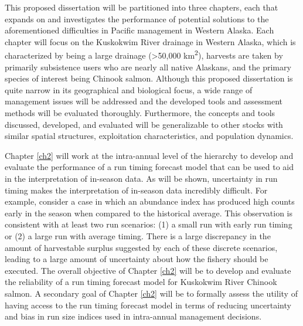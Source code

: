\documentclass[12pt,]{book}
\theoremstyle{definition}
\theoremstyle{definition}
\theoremstyle{definition}
\theoremstyle{remark}
\begin{document}
This proposed dissertation will be partitioned into three chapters, each
that expands on and investigates the performance of potential solutions
to the aforementioned difficulties in Pacific management in Western
Alaska. Each chapter will focus on the Kuskokwim River drainage in
Western Alaska, which is characterized by being a large drainage
(\textgreater{}50,000 km\textsuperscript{2}), harvests are taken by
primarily subsistence users who are nearly all native Alaskans, and the
primary species of interest being Chinook salmon. Although this proposed
dissertation is quite narrow in its geographical and biological focus, a
wide range of management issues will be addressed and the developed
tools and assessment methods will be evaluated thoroughly. Furthermore,
the concepts and tools discussed, developed, and evaluated will be
generalizable to other stocks with similar spatial structures,
exploitation characteristics, and population dynamics.

Chapter \ref{ch2} will work at the intra-annual level of the hierarchy
to develop and evaluate the performance of a run timing forecast model
that can be used to aid in the interpretation of in-season data. As will
be shown, uncertainty in run timing makes the interpretation of
in-season data incredibly difficult. For example, consider a case in
which an abundance index has produced high counts early in the season
when compared to the historical average. This observation is consistent
with at least two run scenarios: (1) a small run with early run timing
or (2) a large run with average timing. There is a large discrepancy in
the amount of harvestable surplus suggested by each of these discrete
scenarios, leading to a large amount of uncertainty about how the
fishery should be executed. The overall objective of Chapter \ref{ch2}
will be to develop and evaluate the reliability of a run timing forecast
model for Kuskokwim River Chinook salmon. A secondary goal of Chapter
\ref{ch2} will be to formally assess the utility of having access to the
run timing forecast model in terms of reducing uncertainty and bias in
run size indices used in intra-annual management decisions.
\end{document}
